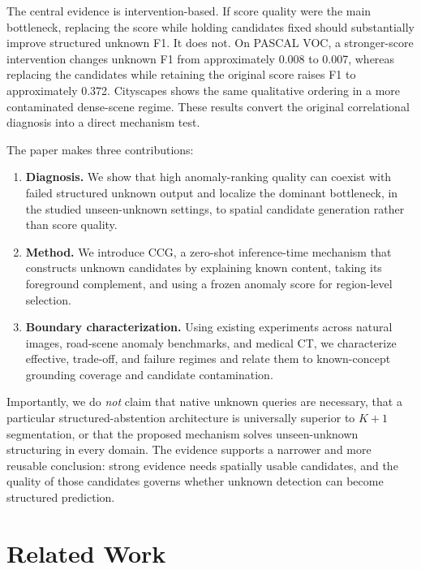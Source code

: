\documentclass[journal]{IEEEtai}
\newcommand{\CCG}{\textsc{CCG}\xspace}
\begin{document}
The central evidence is intervention-based. If score quality were the main bottleneck, replacing the score while holding candidates fixed should substantially improve structured unknown F1. It does not. On PASCAL VOC, a stronger-score intervention changes unknown F1 from approximately 0.008 to 0.007, whereas replacing the candidates while retaining the original score raises F1 to approximately 0.372. Cityscapes shows the same qualitative ordering in a more contaminated dense-scene regime. These results convert the original correlational diagnosis into a direct mechanism test.

The paper makes three contributions:
\begin{enumerate}[leftmargin=*]
    \item \textbf{Diagnosis.} We show that high anomaly-ranking quality can coexist with failed structured unknown output and localize the dominant bottleneck, in the studied unseen-unknown settings, to spatial candidate generation rather than score quality.
    \item \textbf{Method.} We introduce \CCG, a zero-shot inference-time mechanism that constructs unknown candidates by explaining known content, taking its foreground complement, and using a frozen anomaly score for region-level selection.
    \item \textbf{Boundary characterization.} Using existing experiments across natural images, road-scene anomaly benchmarks, and medical CT, we characterize effective, trade-off, and failure regimes and relate them to known-concept grounding coverage and candidate contamination.
\end{enumerate}

Importantly, we do \emph{not} claim that native unknown queries are necessary, that a particular structured-abstention architecture is universally superior to $K{+}1$ segmentation, or that the proposed mechanism solves unseen-unknown structuring in every domain. The evidence supports a narrower and more reusable conclusion: strong evidence needs spatially usable candidates, and the quality of those candidates governs whether unknown detection can become structured prediction.

\section{Related Work}
\label{sec:related}
\end{document}
